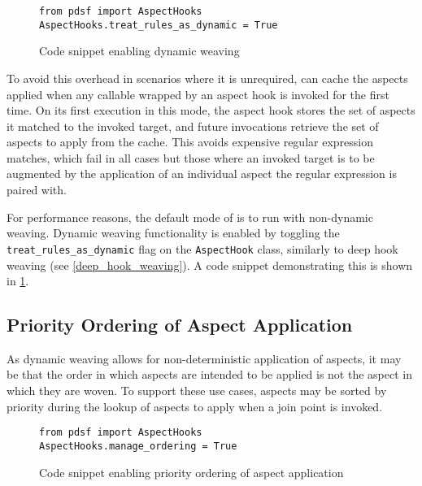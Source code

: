 \begin{figure}
    \begin{lstlisting}
from pdsf import AspectHooks
AspectHooks.treat_rules_as_dynamic = True
    \end{lstlisting}
    \caption{Code snippet enabling dynamic weaving}
    \label{fig:enabling_dynamic_weaving}
\end{figure}

To avoid this overhead in scenarios where it is unrequired, \pdsf can cache the
aspects applied when any callable wrapped by an aspect hook is invoked for the
first time. On its first execution in this mode, the aspect hook stores the set
of aspects it matched to the invoked target, and future invocations retrieve the
set of aspects to apply from the cache. This avoids expensive regular expression
matches, which fail in all cases but those where an invoked target is to be
augmented by the application of an individual aspect the regular expression is
paired with.

For performance reasons, the default mode of \pdsf is to run with non-dynamic
weaving. Dynamic weaving functionality is enabled by toggling the
\lstinline{treat_rules_as_dynamic} flag on the \lstinline{AspectHook} class,
similarly to deep hook weaving (see \cref{deep_hook_weaving}). A code snippet
demonstrating this is shown in \cref{fig:enabling_dynamic_weaving}.


\subsection{Priority Ordering of Aspect Application}\label{aspect_priority_support}

As dynamic weaving allows for non-deterministic application of aspects, it may
be that the order in which aspects are intended to be applied is not the aspect
in which they are woven. To support these use cases, aspects may be sorted by
priority during the lookup of aspects to apply when a join point is invoked.

\begin{figure}
    \begin{lstlisting}
from pdsf import AspectHooks
AspectHooks.manage_ordering = True
    \end{lstlisting}
    \caption{Code snippet enabling priority ordering of aspect application}
    \label{fig:enabling_priority_sorting_of_aspects}
\end{figure}

